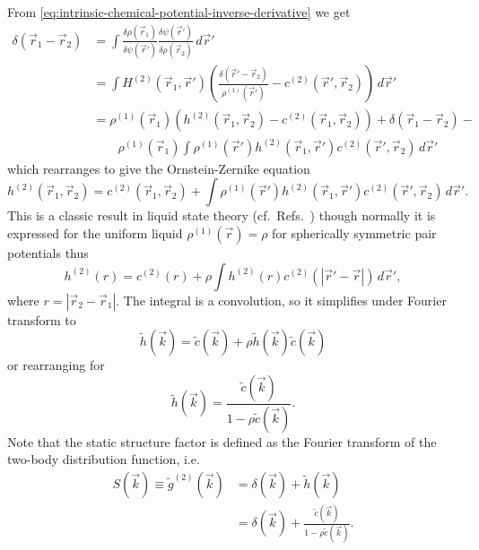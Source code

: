 \documentclass[12pt]{report}
\begin{document}
From \eqref{eq:intrinsic-chemical-potential-inverse-derivative} we get
\begin{equation*}
  \begin{aligned}
    \delta(\vec{r}_1 - \vec{r}_2) &=
    \int
    \frac{\delta \rho(\vec{r}_1)}{\delta \psi(\vec{r}')}
    \frac{\delta \psi(\vec{r}')}{\delta \rho(\vec{r}_2)}
    \, d\vec{r}' \\
    &=
    \int
    H^{(2)}(\vec{r}_1, \vec{r}')
    \left(
    \frac{\delta(\vec{r}' - \vec{r}_2)}{\rho^{(1)}(\vec{r}')} -
    c^{(2)}(\vec{r}', \vec{r}_2)
    \right)
    \, d\vec{r}' \\
    &=
    \rho^{(1)}(\vec{r}_1)
    \left(
    h^{(2)}(\vec{r}_1, \vec{r}_2) -
    c^{(2)}(\vec{r}_1, \vec{r}_2)
    \right) +
    \delta(\vec{r}_1 - \vec{r}_2) - \\
    &\qquad
    \rho^{(1)}(\vec{r}_1)
    \int
    \rho^{(1)}(\vec{r}')
    h^{(2)}(\vec{r}_1, \vec{r}')
    c^{(2)}(\vec{r}', \vec{r}_2)
    \, d\vec{r}'
  \end{aligned}
\end{equation*}
which rearranges to give the Ornstein-Zernike equation
\begin{equation}
  h^{(2)}(\vec{r}_1, \vec{r}_2) =
  c^{(2)}(\vec{r}_1, \vec{r}_2) +
  \int
  \rho^{(1)}(\vec{r}')
  h^{(2)}(\vec{r}_1, \vec{r}')
  c^{(2)}(\vec{r}', \vec{r}_2)
  \, d\vec{r}'.
\end{equation}
This is a classic result in liquid state theory (cf.\ Refs.\ \cite{Ornstein1914,Hansen2010,Evans1979}) though normally it is expressed for the uniform liquid $\rho^{(1)}(\vec{r}) = \rho$ for spherically symmetric pair potentials thus
\begin{equation}
  h^{(2)}(r) =
  c^{(2)}(r) +
  \rho
  \int
  h^{(2)}(r)
  c^{(2)}(|\vec{r}' - \vec{r}|)
  \, d\vec{r}',
\end{equation}
where $r = |\vec{r}_2 - \vec{r}_1|$.
The integral is a convolution, so it simplifies under Fourier transform to
\begin{equation}
  \tilde{h}(\vec{k}) =
  \tilde{c}(\vec{k}) +
  \rho \tilde{h}(\vec{k}) \tilde{c}(\vec{k})
\end{equation}
or rearranging for
\begin{equation}
  \tilde{h}(\vec{k}) =
  \frac{\tilde{c}(\vec{k})}{1 - \rho \tilde{c}(\vec{k})}.
\end{equation}
Note that the static structure factor is defined as the Fourier transform of the two-body distribution function, i.e.\
\begin{equation}
  \begin{aligned}
    S(\vec{k}) \equiv \tilde{g}^{(2)}(\vec{k}) &=
    \delta(\vec{k}) + \tilde{h}(\vec{k}) \\
    &=
    \delta(\vec{k}) +
    \frac{\tilde{c}(\vec{k})}{1 - \rho \tilde{c}(\vec{k})}.
  \end{aligned}
\end{equation}
\end{document}
